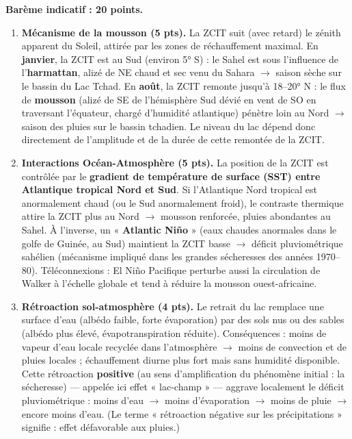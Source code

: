\documentclass[11pt]{article}
\newcommand{\cle}[1]{{\popxbold\color{popdark}#1}}
\begin{document}
\begin{corrige}
\textbf{Barème indicatif : 20 points.}

\begin{enumerate}
    \item \textbf{Mécanisme de la mousson (5 pts).} La \cle{ZCIT} suit (avec retard) le zénith apparent du Soleil, attirée par les zones de réchauffement maximal. En \textbf{janvier}, la ZCIT est au Sud (environ 5° S) : le Sahel est sous l'influence de l'\textbf{harmattan}, alizé de NE chaud et sec venu du Sahara $\rightarrow$ saison sèche sur le bassin du Lac Tchad. En \textbf{août}, la ZCIT remonte jusqu'à 18–20° N : le flux de \textbf{mousson} (alizé de SE de l'hémisphère Sud dévié en vent de SO en traversant l'équateur, chargé d'humidité atlantique) pénètre loin au Nord $\rightarrow$ saison des pluies sur le bassin tchadien. Le niveau du lac dépend donc directement de l'amplitude et de la durée de cette remontée de la ZCIT.
    \item \textbf{Interactions Océan-Atmosphère (5 pts).} La position de la ZCIT est contrôlée par le \textbf{gradient de température de surface (SST) entre Atlantique tropical Nord et Sud}. Si l'Atlantique Nord tropical est anormalement chaud (ou le Sud anormalement froid), le contraste thermique attire la ZCIT plus au Nord $\rightarrow$ mousson renforcée, pluies abondantes au Sahel. À l'inverse, un « \textbf{Atlantic Niño} » (eaux chaudes anormales dans le golfe de Guinée, au Sud) maintient la ZCIT basse $\rightarrow$ déficit pluviométrique sahélien (mécanisme impliqué dans les grandes sécheresses des années 1970–80). Téléconnexions : El Niño Pacifique perturbe aussi la circulation de Walker à l'échelle globale et tend à réduire la mousson ouest-africaine.
    \item \textbf{Rétroaction sol-atmosphère (4 pts).} Le retrait du lac remplace une surface d'eau (albédo faible, forte évaporation) par des sols nus ou des sables (albédo plus élevé, évapotranspiration réduite). Conséquences : moins de vapeur d'eau locale recyclée dans l'atmosphère $\rightarrow$ moins de convection et de pluies locales ; échauffement diurne plus fort mais sans humidité disponible. Cette rétroaction \textbf{positive} (au sens d'amplification du phénomène initial : la sécheresse) — appelée ici effet « lac-champ » — aggrave localement le déficit pluviométrique : moins d'eau $\rightarrow$ moins d'évaporation $\rightarrow$ moins de pluie $\rightarrow$ encore moins d'eau. (Le terme « rétroaction négative sur les précipitations » signifie : effet défavorable aux pluies.)

\end{enumerate}
\end{corrige}
\end{document}
